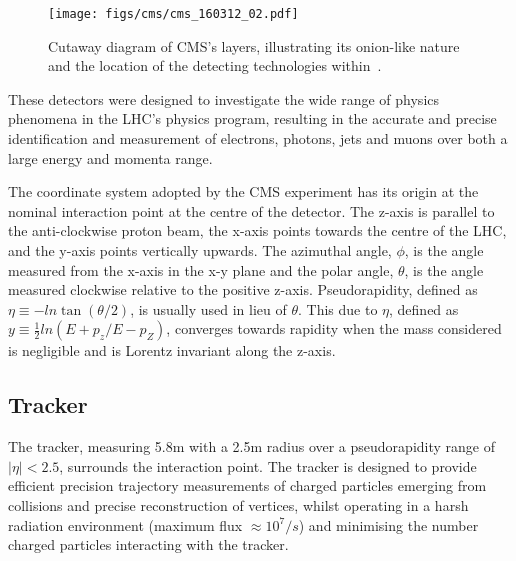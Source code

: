 \begin{figure}[htb]
\begin{center}
\texttt{[image: figs/cms/cms\_160312\_02.pdf]}
\caption{Cutaway diagram of CMS’s layers, illustrating its onion-like nature and the location of the detecting technologies within~\cite{Sakuma:2013jqa}.}
\label{fig:cms-cutaway}
\end{center}
\end{figure}

These detectors were designed to investigate the wide range of physics phenomena in the LHC's physics program, resulting in the accurate and precise identification and measurement of electrons, photons, jets and muons over both a large energy and momenta range.

The coordinate system adopted by the CMS experiment has its origin at the nominal interaction point at the centre of the detector. 
The z-axis is parallel to the anti-clockwise proton beam, the x-axis points towards the centre of the LHC, and the y-axis points vertically upwards.
The azimuthal angle, $\phi$, is the angle measured from the x-axis in the x-y plane and the polar angle, $\theta$, is the angle measured clockwise relative to the positive z-axis.
Pseudorapidity, defined as $\eta \equiv -ln\tan(\theta/2)$, is usually used in lieu of $\theta$.
This due to $\eta$, defined as $y \equiv \frac{1}{2} ln(E+p_{z}/E-p_{Z})$, converges towards rapidity when the mass considered is negligible and is Lorentz invariant along the z-axis.

\subsection{Tracker}\label{subsec:tracker}
The tracker, measuring 5.8m with a 2.5m radius over a pseudorapidity range of $|\eta| < 2.5$, surrounds the interaction point.
The tracker is designed to provide efficient precision trajectory measurements of charged particles emerging from collisions and precise reconstruction of vertices, whilst operating in a harsh radiation environment (maximum flux $\approx 10^{7}/s$) and minimising the number charged particles interacting with the tracker.

